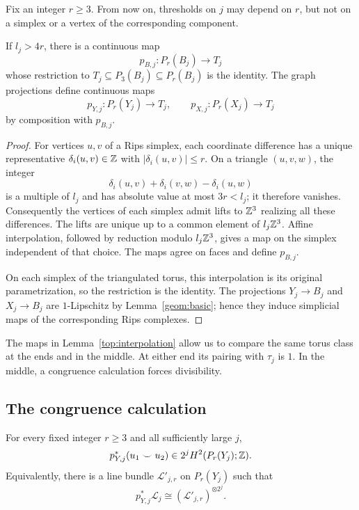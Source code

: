 Fix an integer $r\geq3$. From now on, thresholds on $j$ may depend on
$r$, but not on a simplex or a vertex of the corresponding component.

\begin{lemma}
\label{top:interpolation}
If $l_j>4r$, there is a continuous map
\[
 p_{B,j}:P_r(B_j)\longrightarrow T_j
\]
whose restriction to $T_j\subseteq P_3(B_j)\subseteq P_r(B_j)$ is the
identity. The graph projections define continuous maps
\[
 p_{Y,j}:P_r(Y_j)\longrightarrow T_j,
 \qquad
 p_{X,j}:P_r(X_j)\longrightarrow T_j
\]
by composition with $p_{B,j}$.
\end{lemma}

\begin{proof}
For vertices $u,v$ of a Rips simplex, each coordinate difference has a
unique representative $\delta_i(u,v)\in\mathbb Z$ with
$|\delta_i(u,v)|\leq r$. On a triangle $(u,v,w)$, the integer
\[
 \delta_i(u,v)+\delta_i(v,w)-\delta_i(u,w)
\]
is a multiple of $l_j$ and has absolute value at most $3r<l_j$; it
therefore vanishes. Consequently the vertices of each simplex admit
lifts to $\mathbb Z^3$ realizing all these differences. The lifts are unique
up to a common element of $l_j\mathbb Z^3$. Affine interpolation, followed by
reduction modulo $l_j\mathbb Z^3$, gives a map on the simplex independent of
that choice. The maps agree on faces and define $p_{B,j}$.

On each simplex of the triangulated torus, this interpolation is its
original parametrization, so the restriction is the identity. The
projections $Y_j\to B_j$ and $X_j\to B_j$ are $1$-Lipschitz by
Lemma~\ref{geom:basic}; hence they induce simplicial maps of the
corresponding Rips complexes.
\end{proof}

The maps in Lemma~\ref{top:interpolation} allow us to compare the same
torus class at the ends and in the middle. At either end its pairing
with $\tau_j$ is $1$. In the middle, a congruence calculation forces
divisibility.

\subsection{The congruence calculation}

\begin{lemma}
\label{top:chern-divisibility}
For every fixed integer $r\geq3$ and all sufficiently large $j$,
\begin{equation}
 p_{Y,j}^*(u_1\smile u_2)
 \in 2^j H^2(P_r(Y_j);\mathbb Z).
 \label{top:chern-divisibility-eq}
\end{equation}
Equivalently, there is a line bundle $\mathcal L'_{j,r}$ on
$P_r(Y_j)$ such that
\begin{equation}
 p_{Y,j}^*\mathcal L_j
 \cong(\mathcal L'_{j,r})^{\otimes 2^j}.
 \label{top:line-root}
\end{equation}
\end{lemma}

